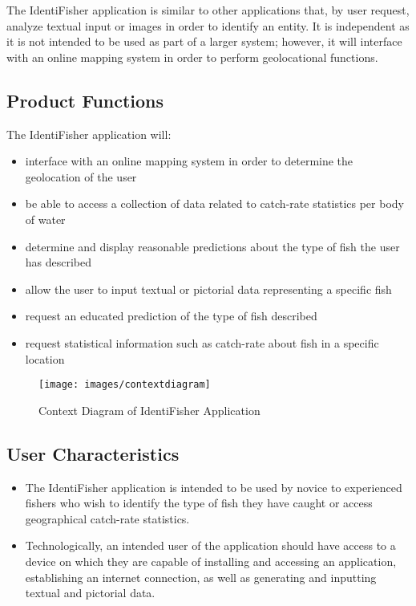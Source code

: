 \documentclass{article}
\begin{document}
The IdentiFisher application is similar to other applications that,
by user request, analyze textual input or images in order to identify
an entity. It is independent as it is not intended to be used as part
of a larger system; however, it will interface with an online mapping
system in order to perform geolocational functions.

\subsection{Product Functions}
The IdentiFisher application will: 
\begin{itemize}
	\item
	interface with an online mapping system in order to determine the geolocation of the user
	\item
	be able to access a collection of data related to catch-rate statistics per body of water
	\item
	determine and display reasonable predictions about the type of fish the user has described
	\item
	allow the user to input textual or pictorial data representing a specific fish
	\item
	request an educated prediction of the type of fish described
	\item
	request statistical information such as catch-rate about fish in a specific location
\end{itemize} 


\begin{figure}[H]
	\texttt{[image: images/contextdiagram]}
	\caption{Context Diagram of IdentiFisher Application}
\end{figure}


\subsection{User Characteristics}
\begin{itemize}
	\item
	The IdentiFisher application is intended to be used by novice to experienced fishers who wish to identify the type of fish they have caught or access geographical catch-rate statistics.

	\item
	Technologically, an intended user of the application should have access to a device on which they are capable of installing and accessing an application, establishing an internet connection, as well as generating and inputting textual and pictorial data. 
\end{itemize}
\end{document}
